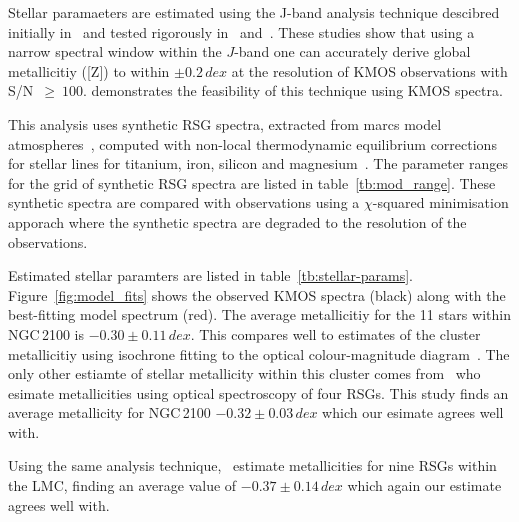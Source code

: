 \documentclass[useAMS,usenatbib]{mn2e}
\begin{document}
Stellar paramaeters are estimated using the J-band analysis technique descibred initially in~\cite{2010MNRAS.407.1203D}
and tested rigorously in~\cite{2014ApJ...788...58G} and~\cite{2015ApJ...806...21D}.
These studies show that using a narrow spectral window within the $J$-band one can accurately derive global metallicitiy ([Z]) to within
$\pm0.2\,dex$ at the resolution of KMOS observations with S/N~$\ge~100$.
\cite{2015ApJ...803...14P} demonstrates the feasibility of this technique using KMOS spectra.

This analysis uses synthetic RSG spectra, extracted from {\sc marcs} model atmospheres~\citep{2008A&A...486..951G}, computed with non-local thermodynamic equilibrium corrections for stellar lines for titanium, iron, silicon and magnesium~\citep{2012ApJ...751..156B,2013ApJ...764..115B,2015ApJ...804..113B}.
The parameter ranges for the grid of synthetic RSG spectra are listed in table~\ref{tb:mod_range}.
These synthetic spectra are compared with observations using a $\chi$-squared minimisation apporach where the synthetic spectra are degraded to the resolution of the observations.

Estimated stellar paramters are listed in table~\ref{tb:stellar-params}.
Figure~\ref{fig:model_fits} shows the observed KMOS spectra (black) along with the best-fitting model spectrum (red).
The average metallicitiy for the 11 stars within NGC\,2100 is $-0.30\pm0.11\,dex$.
This compares well to estimates of the cluster metallicitiy using isochrone fitting to the optical colour-magnitude diagram~\citep[$-0.34\,dex$;][]{2015A&A...575A..62N}.
The only other estiamte of stellar metallicity within this cluster comes from~\cite{1994A&A...282..717J}
who esimate metallicities using optical spectroscopy of four RSGs.
This study finds an average metallicity for NGC\,2100 $-0.32\pm0.03\,dex$ which our esimate agrees well with.

Using the same analysis technique,~\cite{2015ApJ...806...21D} estimate metallicities for nine RSGs within the LMC, finding an average value of $-0.37\pm0.14\,dex$ which again our estimate agrees well with.
\end{document}
